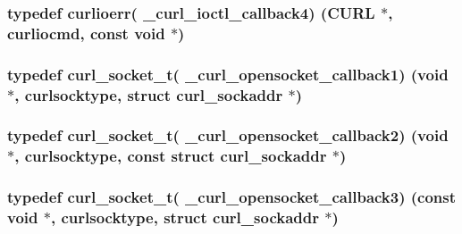 \subsubsection[{\+\_\+curl\+\_\+ioctl\+\_\+callback4}]{\setlength{\rightskip}{0pt plus 5cm}typedef {\bf curlioerr}( \+\_\+curl\+\_\+ioctl\+\_\+callback4) ({\bf C\+U\+R\+L} $\ast$, {\bf curliocmd}, const void $\ast$)}\label{typecheck-gcc_8h_ab1a3806b61adfbc7040daf6f6d115f02}
\hypertarget{typecheck-gcc_8h_a3e4f955d1af288f560f2cad5991caa14}{}
\subsubsection[{\+\_\+curl\+\_\+opensocket\+\_\+callback1}]{\setlength{\rightskip}{0pt plus 5cm}typedef {\bf curl\+\_\+socket\+\_\+t}( \+\_\+curl\+\_\+opensocket\+\_\+callback1) (void $\ast$, {\bf curlsocktype}, struct {\bf curl\+\_\+sockaddr} $\ast$)}\label{typecheck-gcc_8h_a3e4f955d1af288f560f2cad5991caa14}
\hypertarget{typecheck-gcc_8h_a94ad8a966561cb2d8182d913924ea3d4}{}
\subsubsection[{\+\_\+curl\+\_\+opensocket\+\_\+callback2}]{\setlength{\rightskip}{0pt plus 5cm}typedef {\bf curl\+\_\+socket\+\_\+t}( \+\_\+curl\+\_\+opensocket\+\_\+callback2) (void $\ast$, {\bf curlsocktype}, const struct {\bf curl\+\_\+sockaddr} $\ast$)}\label{typecheck-gcc_8h_a94ad8a966561cb2d8182d913924ea3d4}
\hypertarget{typecheck-gcc_8h_a41d3335c85e3e2708a787de313b41735}{}
\subsubsection[{\+\_\+curl\+\_\+opensocket\+\_\+callback3}]{\setlength{\rightskip}{0pt plus 5cm}typedef {\bf curl\+\_\+socket\+\_\+t}( \+\_\+curl\+\_\+opensocket\+\_\+callback3) (const void $\ast$, {\bf curlsocktype}, struct {\bf curl\+\_\+sockaddr} $\ast$)}\label{typecheck-gcc_8h_a41d3335c85e3e2708a787de313b41735}
\hypertarget{typecheck-gcc_8h_ac996e9ffa7bb261a4589ce066ac69bb9}{}
